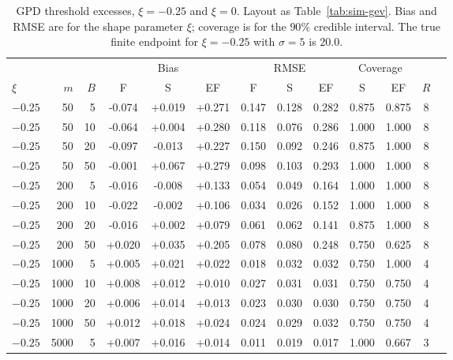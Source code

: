 \begin{table}[t]
\centering
\scriptsize
\renewcommand{\tabcolsep}{3pt}
\caption{GPD threshold excesses, $\xi=-0.25$ and $\xi=0$. Layout as Table~\ref{tab:sim-gev}. Bias and RMSE are for the shape parameter $\xi$; coverage is for the $90\%$ credible interval. The true finite endpoint for $\xi=-0.25$ with $\sigma=5$ is $20.0$.}
\label{tab:sim-gpd}
\begin{adjustbox}{max width=\textwidth}
\begin{tabular}{lrr *{3}{ccc} c}
\toprule
& & & \multicolumn{3}{c}{Bias} & \multicolumn{3}{c}{RMSE} & \multicolumn{2}{c}{Coverage} & \\
\cmidrule(lr){4-6} \cmidrule(lr){7-9} \cmidrule(lr){10-11}
$\xi$ & $m$ & $B$ & F & S & EF & F & S & EF & S & EF & $R$ \\
\midrule
$-0.25$ &   50 &    5 & -0.074 & +0.019 & +0.271 & 0.147 & 0.128 & 0.282 & 0.875 & 0.875 &    8 \\
$-0.25$ &   50 &   10 & -0.064 & +0.004 & +0.280 & 0.118 & 0.076 & 0.286 & 1.000 & 1.000 &    8 \\
$-0.25$ &   50 &   20 & -0.097 & -0.013 & +0.227 & 0.150 & 0.092 & 0.246 & 0.875 & 1.000 &    8 \\
$-0.25$ &   50 &   50 & -0.001 & +0.067 & +0.279 & 0.098 & 0.103 & 0.293 & 1.000 & 1.000 &    8 \\
$-0.25$ &  200 &    5 & -0.016 & -0.008 & +0.133 & 0.054 & 0.049 & 0.164 & 1.000 & 1.000 &    8 \\
$-0.25$ &  200 &   10 & -0.022 & -0.002 & +0.106 & 0.034 & 0.026 & 0.152 & 1.000 & 1.000 &    8 \\
$-0.25$ &  200 &   20 & -0.016 & +0.002 & +0.079 & 0.061 & 0.062 & 0.141 & 0.875 & 1.000 &    8 \\
$-0.25$ &  200 &   50 & +0.020 & +0.035 & +0.205 & 0.078 & 0.080 & 0.248 & 0.750 & 0.625 &    8 \\
$-0.25$ & 1000 &    5 & +0.005 & +0.021 & +0.022 & 0.018 & 0.032 & 0.032 & 0.750 & 1.000 &    4 \\
$-0.25$ & 1000 &   10 & +0.008 & +0.012 & +0.010 & 0.027 & 0.031 & 0.031 & 0.750 & 0.750 &    4 \\
$-0.25$ & 1000 &   20 & +0.006 & +0.014 & +0.013 & 0.023 & 0.030 & 0.030 & 0.750 & 0.750 &    4 \\
$-0.25$ & 1000 &   50 & +0.012 & +0.018 & +0.024 & 0.024 & 0.029 & 0.032 & 0.750 & 0.750 &    4 \\
$-0.25$ & 5000 &    5 & +0.007 & +0.016 & +0.014 & 0.011 & 0.019 & 0.017 & 1.000 & 0.667 &    3 \\

\end{tabular}
\end{adjustbox}
\end{table}
